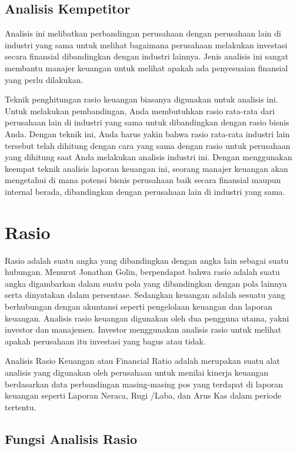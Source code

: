 \documentclass[
]{book}
\begin{document}
\hypertarget{analisis-kempetitor}{%
\subsection{Analisis Kempetitor}\label{analisis-kempetitor}}

Analisis ini melibatkan perbandingan perusahaan dengan perusahaan lain di industri yang sama untuk melihat bagaimana perusahaan melakukan investasi secara finansial dibandingkan dengan industri lainnya. Jenis analisis ini sangat membantu manajer keuangan untuk melihat apakah ada penyesuaian finansial yang perlu dilakukan.

Teknik penghitungan rasio keuangan biasanya digunakan untuk analisis ini. Untuk melakukan pembandingan, Anda membutuhkan rasio rata-rata dari perusahaan lain di industri yang sama untuk dibandingkan dengan rasio bisnis Anda. Dengan teknik ini, Anda harus yakin bahwa rasio rata-rata industri lain tersebut telah dihitung dengan cara yang sama dengan rasio untuk perusahaan yang dihitung saat Anda melakukan analisis industri ini. Dengan menggunakan keempat teknik analisis laporan keuangan ini, seorang manajer keuangan akan mengetahui di mana potensi bisnis perusahaan baik secara finansial maupun internal berada, dibandingkan dengan perusahaan lain di industri yang sama.

\hypertarget{rasio}{%
\section{Rasio}\label{rasio}}

Rasio adalah suatu angka yang dibandingkan dengan angka lain sebagai suatu hubungan. Menurut Jonathan Golin, berpendapat bahwa rasio adalah suatu angka digambarkan dalam suatu pola yang dibandingkan dengan pola lainnya serta dinyatakan dalam persentase. Sedangkan keuangan adalah sesuatu yang berhubungan dengan akuntansi seperti pengelolaan keuangan dan laporan keuangan. Analisis rasio keuangan digunakan oleh dua pengguna utama, yakni investor dan manajemen. Investor menggunakan analisis rasio untuk melihat apakah perusahaan itu investasi yang bagus atau tidak.

Analisis Rasio Keuangan atau Financial Ratio adalah merupakan suatu alat analisis yang digunakan oleh perusahaan untuk menilai kinerja keuangan berdasarkan data perbandingan masing-masing pos yang terdapat di laporan keuangan seperti Laporan Neraca, Rugi /Laba, dan Arus Kas dalam periode tertentu.

\hypertarget{fungsi-analisis-rasio}{%
\subsection{Fungsi Analisis Rasio}\label{fungsi-analisis-rasio}}
\end{document}
